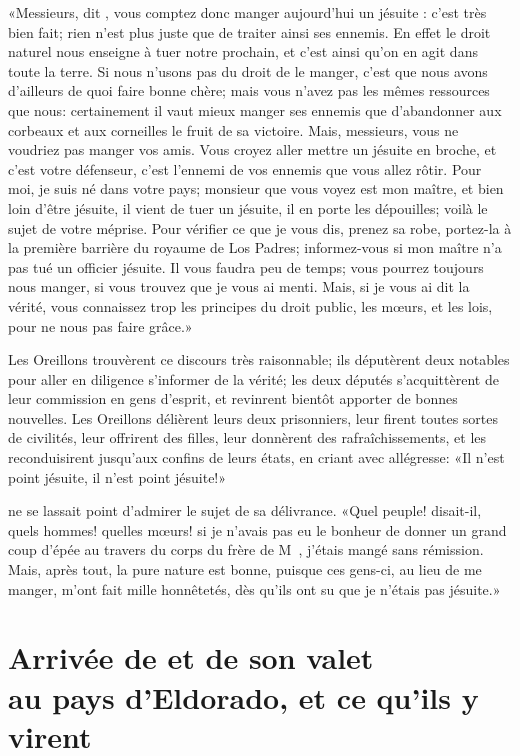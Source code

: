 «Messieurs, dit , vous comptez donc manger aujourd’hui un
jésuite : c’est très bien fait; rien n’est plus juste que de traiter
ainsi ses ennemis. En effet le droit naturel nous enseigne à tuer notre
prochain, et c’est ainsi qu’on en agit dans toute la terre. Si nous
n’usons pas du droit de le manger, c’est que nous avons d’ailleurs de
quoi faire bonne chère; mais vous n’avez pas les mêmes ressources que
nous: certainement il vaut mieux manger ses ennemis que 
d’abandonner
 aux corbeaux et aux corneilles le fruit de sa victoire. Mais,
messieurs, vous ne voudriez pas manger vos amis. Vous croyez aller
mettre un jésuite en broche, et c’est votre défenseur, c’est l’ennemi
de vos ennemis que vous allez rôtir. Pour moi, je suis né dans votre
pays; monsieur que vous voyez est mon maître, et bien loin d’être
jésuite, il vient de tuer un jésuite, il en porte les dépouilles; voilà
le sujet de votre méprise. Pour vérifier ce que je vous dis, prenez sa
robe, portez-la à la première barrière du royaume de Los Padres;
informez-vous si mon maître n’a pas tué un officier jésuite. Il vous
faudra peu de temps; vous pourrez toujours nous manger, si vous trouvez
que je vous ai menti. Mais, si je vous ai dit la vérité, vous
connaissez trop les principes du droit public, les mœurs, et les lois,
pour ne nous pas faire grâce.»

Les Oreillons trouvèrent ce discours très raisonnable; ils députèrent
deux notables pour aller en diligence s’informer de la vérité; les deux
députés s’acquittèrent de leur commission en gens d’esprit, et
revinrent bientôt apporter de bonnes nouvelles. Les Oreillons délièrent
leurs deux prisonniers, leur firent toutes sortes de civilités, leur
offrirent des filles, leur donnèrent des rafraîchissements, et les
reconduisirent jusqu’aux confins de leurs états, en criant avec
allégresse: «Il n’est point jésuite, il n’est point jésuite!»

 ne se lassait point d’admirer le sujet de sa délivrance. «Quel
peuple! disait-il, quels hommes! quelles mœurs! si je n’avais pas eu
le bonheur de donner un grand coup d’épée au travers du corps du frère
de M~, j’étais mangé sans rémission. Mais, après
tout, la pure nature est bonne, puisque ces gens-ci, au lieu de me
manger, m’ont fait mille honnêtetés, dès qu’ils ont su que je n’étais
pas jésuite.»



\chapter[Arrivée de \bname{Candide} et de son valet…]{Arrivée de  et de son valet\\au pays d’Eldorado, et ce qu’ils y
virent}


